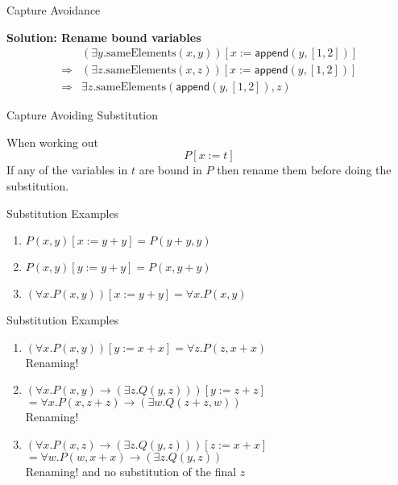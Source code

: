 \documentclass[xetex,aspectratio=169,14pt,hyperref={pdfpagelabels=true,pdflang={en-GB}}]{beamer}
\begin{document}
\begin{frame}
  {Capture Avoidance}

  \bigskip

  \textbf{Solution: Rename bound variables}
  \begin{displaymath}
    \begin{array}{cl}
      &(\exists y. \mathrm{sameElements}(x,y))[x:=\mathsf{append}(y,[1,2])]\\
      \Longrightarrow&(\exists z. \mathrm{sameElements}(x,z))[x:=\mathsf{append}(y,[1,2])]\\
      \Longrightarrow&\exists z. \mathrm{sameElements}(\mathsf{append}(y,[1,2]),z)
    \end{array}
  \end{displaymath}
\end{frame}

\begin{frame}
  {Capture Avoiding Substitution}

  When working out
  \begin{displaymath}
    P[x := t]
  \end{displaymath}
  If any of the variables in $t$ are bound in $P$ then rename them
  before doing the substitution.
\end{frame}

\begin{frame}
  {Substitution Examples}

  \begin{enumerate}
  \item $P(x,y)[x:=y+y]$\pause \quad $= P(y+y,y)$
    \pause
    \bigskip
  \item $P(x,y)[y:=y+y]$\pause \quad $= P(x,y+y)$
    \pause
    \bigskip
  \item $(\forall x. P(x,y))[x:=y+y]$\pause \quad $= \forall x. P(x,y)$
  \end{enumerate}
\end{frame}


\begin{frame}
  {Substitution Examples}

  \begin{enumerate}
  \item $(\forall x. P(x,y))[y:=x+x]$\pause \quad $= \forall z. P(z,x+x)$ \\
    \qquad \textcolor{black!60}{Renaming!}
    \pause
    \bigskip
  \item $(\forall x. P(x,y) \to (\exists z. Q(y,z)))[y:=z+z]$\pause\\
    $= \forall x. P(x,z+z) \to (\exists w. Q(z+z,w))$\\
    \qquad \textcolor{black!60}{Renaming!}
    \pause
    \bigskip
  \item $(\forall x. P(x,z) \to (\exists z. Q(y,z)))[z:=x+x]$\pause\\
    $= \forall w. P(w,x+x) \to (\exists z. Q(y,z))$\\
    \qquad \textcolor{black!60}{Renaming! and no substitution of the final $z$}
  \end{enumerate}
\end{frame}
\end{document}
